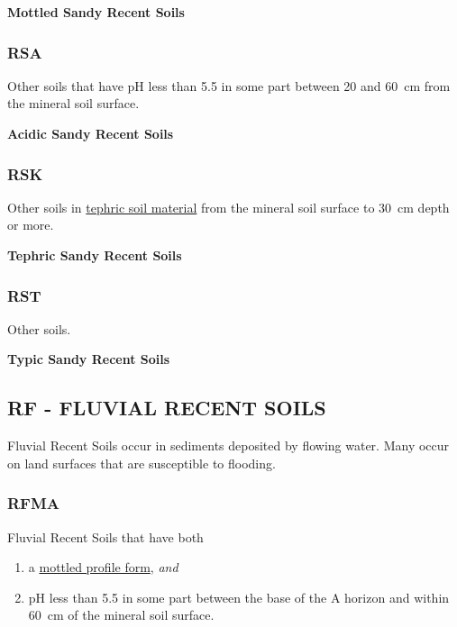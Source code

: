 \documentclass[
  letterpaper,
  DIV=11,
  numbers=noendperiod]{scrreprt}
\providecommand{\tightlist}{%
  \setlength{\itemsep}{0pt}\setlength{\parskip}{0pt}}\usepackage{longtable,booktabs,array}
\begin{document}
\textbf{Mottled Sandy Recent Soils}

\hypertarget{sec-key-RSA}{%
\subsubsection{\texorpdfstring{\textbf{RSA}}{RSA}}\label{sec-key-RSA}}

Other soils that have pH less than 5.5 in some part between 20 and 60~cm
from the mineral soil surface.

\textbf{Acidic Sandy Recent Soils}

\hypertarget{sec-key-RSK}{%
\subsubsection{\texorpdfstring{\textbf{RSK}}{RSK}}\label{sec-key-RSK}}

Other soils in \protect\hyperlink{sec-diag-teph}{tephric soil material}
from the mineral soil surface to 30~cm depth or more.

\textbf{Tephric Sandy Recent Soils}

\hypertarget{sec-key-RST}{%
\subsubsection{\texorpdfstring{\textbf{RST}}{RST}}\label{sec-key-RST}}

Other soils.

\textbf{Typic Sandy Recent Soils}

\hypertarget{sec-RF}{%
\subsection{\texorpdfstring{\textbf{RF} - FLUVIAL RECENT
SOILS}{RF - FLUVIAL RECENT SOILS}}\label{sec-RF}}

Fluvial Recent Soils occur in sediments deposited by flowing water. Many
occur on land surfaces that are susceptible to flooding.

\hypertarget{sec-key-RFMA}{%
\subsubsection{\texorpdfstring{\textbf{RFMA}}{RFMA}}\label{sec-key-RFMA}}

Fluvial Recent Soils that have both

\begin{enumerate}
\def\labelenumi{\arabic{enumi}.}
\tightlist
\item
  a \protect\hyperlink{sec-diag-mottpf}{mottled profile form},
  \emph{and}
\item
  pH less than 5.5 in some part between the base of the A horizon and
  within 60~cm of the mineral soil surface.
\end{enumerate}
\end{document}
